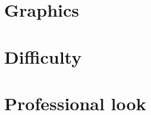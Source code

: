 \documentclass[11pt]{article}
\begin{document}
\section*{Graphics}

\vspace*{0.75in}


\section*{Difficulty}

\vspace*{0.75in}


\section*{Professional look}

\vspace*{0.75in}

\end{document}
